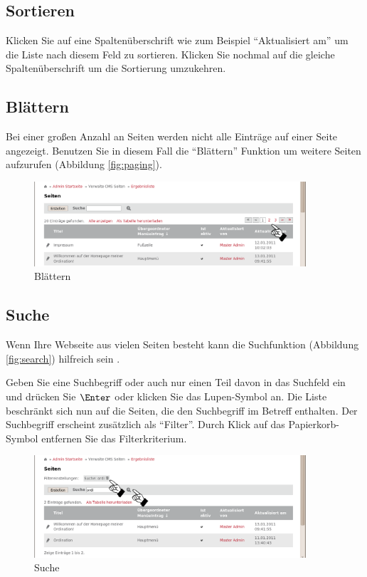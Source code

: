 \documentclass[article, a4paper, oneside, 11pt]{memoir}
\begin{document}
\subsection{Sortieren}

Klicken Sie auf eine Spaltenüberschrift wie zum Beispiel "`Aktualisiert am"' um die Liste nach diesem Feld zu sortieren. Klicken Sie nochmal auf die gleiche Spaltenüberschrift um die Sortierung umzukehren.


\subsection{Blättern}

Bei einer großen Anzahl an Seiten werden nicht alle Einträge auf einer Seite angezeigt. Benutzen Sie in diesem Fall die "`Blättern"' Funktion um weitere Seiten aufzurufen (Abbildung \vref{fig:paging}).

\begin{figure}[htp]
\centering
\includegraphics[width=0.9\textwidth]{paging}
\caption{Blättern}
\label{fig:paging}
\end{figure}


\subsection{Suche}

Wenn Ihre Webseite aus vielen Seiten besteht kann die Suchfunktion (Abbildung \vref{fig:search}) hilfreich sein .

Geben Sie eine Suchbegriff oder auch nur einen Teil davon in das Suchfeld ein und drücken Sie $\Enter$ oder klicken Sie das Lupen-Symbol an.
Die Liste beschränkt sich nun auf die Seiten, die den Suchbegriff im Betreff enthalten. Der Suchbegriff erscheint zusätzlich als "`Filter"'. Durch Klick auf das Papierkorb-Symbol entfernen Sie das Filterkriterium.

\begin{figure}[htp]
\centering
\includegraphics[width=0.9\textwidth]{search}
\caption{Suche}
\label{fig:search}
\end{figure}
\end{document}

